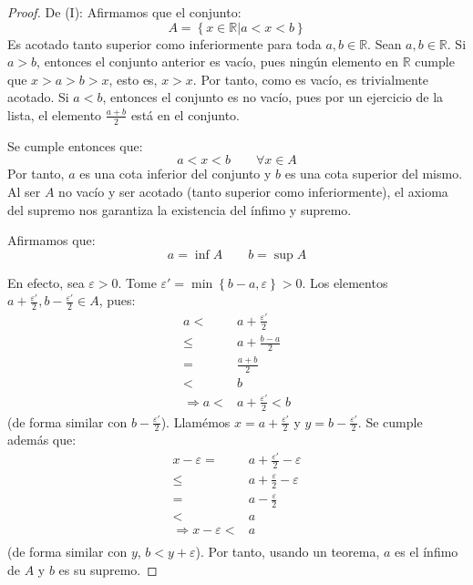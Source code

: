 \documentclass[12pt]{article}
\begin{document}
\begin{enumerate}
    \begin{proof}
        De (I): Afirmamos que el conjunto:
        \begin{equation*}
            A = \left\{x\in\mathbb{R}|a<x<b\right\}
        \end{equation*}
        Es acotado tanto superior como inferiormente para toda $a,b\in\mathbb{R}$. Sean $a,b\in\mathbb{R}$. Si $a>b$, entonces el conjunto anterior es vacío, pues ningún elemento en $\mathbb{R}$ cumple que $x>a>b>x$, esto es, $x>x$. Por tanto, como es vacío, es trivialmente acotado.
        Si $a<b$, entonces el conjunto es no vacío, pues por un ejercicio de la lista, el elemento $\frac{a+b}{2}$ está en el conjunto.
        
        Se cumple entonces que:
        \begin{equation*}
            a<x<b\qquad\forall x\in A
        \end{equation*}
        Por tanto, $a$ es una cota inferior del conjunto y $b$ es una cota superior del mismo. Al ser $A$ no vacío y ser acotado (tanto superior como inferiormente), el axioma del supremo nos garantiza la existencia del ínfimo y supremo.

        Afirmamos que:
        \begin{equation*}
            a=\inf A\qquad b=\sup A
        \end{equation*}

        En efecto, sea $\varepsilon > 0$. Tome $\varepsilon' = \min\left\{b-a,\varepsilon\right\}>0$. Los elementos $a+\frac{\varepsilon'}{2},b-\frac{\varepsilon'}{2}\in A$, pues:
        \begin{equation*}
            \begin{split}
                a < &a+\frac{\varepsilon'}{2}\\
                \leq&a+\frac{b-a}{2}\\
                =&\frac{a+b}{2}\\
                <& b\\
                \Rightarrow a<&a+\frac{\varepsilon'}{2}<b
            \end{split}
        \end{equation*}
        (de forma similar con $b-\frac{\varepsilon'}{2}$). Llamémos $x=a+\frac{\varepsilon'}{2}$ y $y=b-\frac{\varepsilon'}{2}$. Se cumple además que:
        \begin{equation*}
            \begin{split}
                x-\varepsilon=&a+\frac{\varepsilon'}{2}-\varepsilon\\
                \leq&a+\frac{\varepsilon}{2}-\varepsilon\\
                =&a-\frac{\varepsilon}{2}\\
                <&a\\
                \Rightarrow x-\varepsilon <&a\\
            \end{split}
        \end{equation*}
        (de forma similar con $y$, $b<y+\varepsilon$). Por tanto, usando un teorema, $a$ es el ínfimo de $A$ y $b$ es su supremo.


\end{proof}
\end{enumerate}
\end{document}
